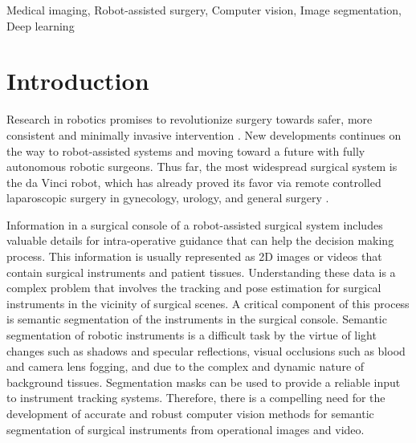 \documentclass[runningheads,a4paper]{llncs}[2015/06/24]
\newcommand{\commentatside}[1]{\pdfcomment[color={0.045 0.278 0.643},icon=Note]{#1}}
\newcommand{\todo}[1]{\commentatside{#1}}
\begin{document}
\begin{keywords}
Medical imaging, Robot-assisted surgery, Computer vision, Image segmentation, Deep learning
\end{keywords}

\section{Introduction}\label{sec:intro}

Research in robotics promises to revolutionize surgery towards safer, more consistent and minimally invasive intervention \cite{burgner2015continuum, munzer2018content}. New developments continues on the way to robot-assisted systems and moving toward a future with fully autonomous robotic surgeons. Thus far, the most widespread surgical system is the da Vinci robot, which has already proved its favor via remote controlled laparoscopic surgery in gynecology, urology, and general surgery \cite{burgner2015continuum}.


Information in a surgical console of a robot-assisted surgical system includes valuable details for intra-operative guidance that can help the decision making process. This information is usually represented as 2D images or videos that contain surgical instruments and patient tissues. Understanding these data is a complex problem that involves the tracking and pose estimation for surgical instruments in the vicinity of surgical scenes. A critical component of this process is semantic segmentation of the instruments in the surgical console. Semantic segmentation of robotic instruments is a difficult task by the virtue of light changes such as shadows and specular reflections, visual occlusions such as blood and camera lens fogging, and due to the complex and dynamic nature of background tissues. Segmentation masks can be used to provide a reliable input to instrument tracking systems. Therefore, there is a compelling need for the development of accurate and robust computer vision methods for semantic segmentation of surgical instruments from operational images and video. 
\end{document}
